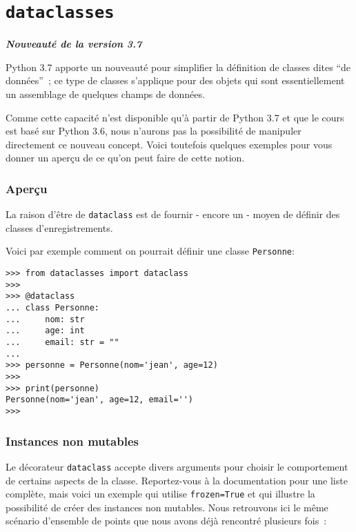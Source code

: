     
    
    
    

    

    \hypertarget{dataclasses}{%
\section{\texorpdfstring{\texttt{dataclasses}}{dataclasses}}\label{dataclasses}}

\textbf{\emph{Nouveauté de la version 3.7}}

Python 3.7 apporte un nouveauté pour simplifier la définition de classes
dites ``de données''~; ce type de classes s'applique pour des objets qui
sont essentiellement un assemblage de quelques champs de données.

    Comme cette capacité n'est disponible qu'à partir de Python 3.7 et que
le cours est basé sur Python 3.6, nous n'aurons pas la possibilité de
manipuler directement ce nouveau concept. Voici toutefois quelques
exemples pour vous donner un aperçu de ce qu'on peut faire de cette
notion.

    \hypertarget{aperuxe7u}{%
\subsubsection{Aperçu}\label{aperuxe7u}}

    La raison d'être de \texttt{dataclass} est de fournir - encore un -
moyen de définir des classes d'enregistrements.

Voici par exemple comment on pourrait définir une classe
\texttt{Personne}:

    \begin{verbatim}
>>> from dataclasses import dataclass
>>>
>>> @dataclass
... class Personne:
...     nom: str
...     age: int
...     email: str = ""
...
>>> personne = Personne(nom='jean', age=12)
>>>
>>> print(personne)
Personne(nom='jean', age=12, email='')
>>>
\end{verbatim}

    \hypertarget{instances-non-mutables}{%
\subsubsection{Instances non mutables}\label{instances-non-mutables}}

    Le décorateur \texttt{dataclass} accepte divers arguments pour choisir
le comportement de certains aspects de la classe. Reportez-vous à la
documentation pour une liste complète, mais voici un exemple qui utilise
\texttt{frozen=True} et qui illustre la possibilité de créer des
instances non mutables. Nous retrouvons ici le même scénario d'ensemble
de points que nous avons déjà rencontré plusieurs fois~:

